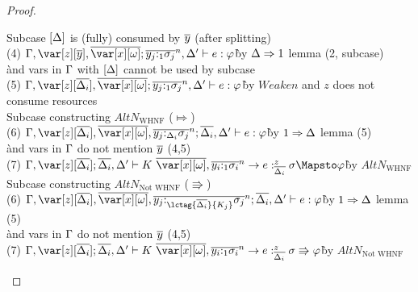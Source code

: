 \begin{proof}
\begin{description}
\begin{tabbing}
    Subcase $\left[\Delta\right]$ is (fully) consumed by $\overline{y}$ (after splitting)\\
    (4) $\G,\z[\ov{y}],\ov{\xo};\ov{y_j{:}_{1}\s_j}^n, \D' \vdash e : \vp$\`by $\Delta \Rightarrow 1$ lemma (2, subcase)\\\` and vars in $\Gamma$ with $\left[\Delta\right]$ cannot be used by subcase\\
    (5) $\G,\z[\ov{\D_i}],\ov{\xo};\ov{y_j{:}_{1}\s_j}^n, \D' \vdash e : \vp$\`by $Weaken$ and $z$ does not consume resources\\
    Subcase constructing $AltN_{\textrm{WHNF}}$ ($\Mapsto$)\\
    (6) $\G,\z[\ov{\D_i}],\ov{\xo},\ov{y_j{:}_{\D_i}\s_j}^n; \ov{\D_i}, \D' \vdash e : \vp$\`by $1 \Rightarrow \Delta$ lemma (5)\\\`and vars in $\Gamma$ do not mention $\overline{y}$ (4,5)\\
    (7) $\G,\z[\ov{\D_i}]; \ov{\D_i}, \D' \vdash K~\ov{\xo},\ov{y_i{:}_{1}\s_i}^n\to e :^z_{\ov{\D_i}} \s \Mapsto \vp$\`by $AltN_{\textrm{WHNF}}$\\
    Subcase constructing $AltN_{\textrm{Not WHNF}}$ ($\Rrightarrow$)\\
    (6) $\G,\z[\ov{\D_i}],\ov{\xo},\ov{y_j{:}_{\lctag{\ov{\D_i}}{K_j}}\s_j}^n; \ov{\D_i}, \D' \vdash e : \vp$\`by $1 \Rightarrow \Delta$ lemma (5)\\\`and vars in $\Gamma$ do not mention $\overline{y}$ (4,5)\\
    (7) $\G,\z[\ov{\D_i}]; \ov{\D_i}, \D' \vdash K~\ov{\xo},\ov{y_i{:}_{1}\s_i}^n\to e :^z_{\ov{\D_i}} \s \Rrightarrow \vp$\`by $AltN_{\textrm{Not WHNF}}$\\
\end{tabbing}

\end{description}
\end{proof}

